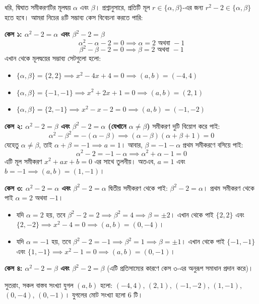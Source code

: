 \documentclass[12pt, a4paper]{article}
\begin{document}
\begin{tcolorbox}[solutionbox={সমাধান (Solution)}]
    \noindent
    ধরি, দ্বিঘাত সমীকরণটির মূলদ্বয় $\alpha$ এবং $\beta$। প্রশ্নানুসারে, প্রতিটি মূল $r \in \{\alpha, \beta\}$-এর জন্য $r^2 - 2 \in \{\alpha, \beta\}$ হতে হবে। আমরা নিচের ৪টি সম্ভাব্য কেস বিবেচনা করতে পারি:
    
    \vspace{0.5em}
    \textbf{কেস ১: $\alpha^2 - 2 = \alpha$ এবং $\beta^2 - 2 = \beta$}
    \[ \alpha^2 - \alpha - 2 = 0 \implies \alpha = 2 \text{ অথবা } -1 \]
    \[ \beta^2 - \beta - 2 = 0 \implies \beta = 2 \text{ অথবা } -1 \]
    এখান থেকে মূলদ্বয়ের সম্ভাব্য সেটগুলো হলো:
    \begin{itemize}
        \item $\{\alpha, \beta\} = \{2, 2\} \implies x^2 - 4x + 4 = 0 \implies (a, b) = (-4, 4)$
        \item $\{\alpha, \beta\} = \{-1, -1\} \implies x^2 + 2x + 1 = 0 \implies (a, b) = (2, 1)$
        \item $\{\alpha, \beta\} = \{2, -1\} \implies x^2 - x - 2 = 0 \implies (a, b) = (-1, -2)$
    \end{itemize}
    
    \vspace{0.5em}
    \textbf{কেস ২: $\alpha^2 - 2 = \beta$ এবং $\beta^2 - 2 = \alpha$ (যেখানে $\alpha \ne \beta$)}
    সমীকরণ দুটি বিয়োগ করে পাই:
    \[ \alpha^2 - \beta^2 = -(\alpha - \beta) \implies (\alpha - \beta)(\alpha + \beta + 1) = 0 \]
    যেহেতু $\alpha \ne \beta$, তাই $\alpha + \beta = -1 \implies a = 1$। আবার, $\beta = -1 - \alpha$ প্রথম সমীকরণে বসিয়ে পাই:
    \[ \alpha^2 - 2 = -1 - \alpha \implies \alpha^2 + \alpha - 1 = 0 \]
    এটি মূল সমীকরণ $x^2 + ax + b = 0$ এর সাথে তুলনীয়। অতএব, $a = 1$ এবং $b = -1 \implies (a, b) = (1, -1)$।
    
    \vspace{0.5em}
    \textbf{কেস ৩: $\alpha^2 - 2 = \alpha$ এবং $\beta^2 - 2 = \alpha$}
    দ্বিতীয় সমীকরণ থেকে পাই: $\beta^2 - 2 = \alpha$। প্রথম সমীকরণ থেকে পাই $\alpha = 2$ অথবা $-1$।
    \begin{itemize}
        \item যদি $\alpha = 2$ হয়, তবে $\beta^2 - 2 = 2 \implies \beta^2 = 4 \implies \beta = \pm 2$। এখান থেকে পাই $\{2, 2\}$ এবং $\{2, -2\} \implies x^2 - 4 = 0 \implies (a, b) = (0, -4)$।
        \item যদি $\alpha = -1$ হয়, তবে $\beta^2 - 2 = -1 \implies \beta^2 = 1 \implies \beta = \pm 1$। এখান থেকে পাই $\{-1, -1\}$ এবং $\{1, -1\} \implies x^2 - 1 = 0 \implies (a, b) = (0, -1)$।
    \end{itemize}
    
    \vspace{0.5em}
    \textbf{কেস ৪: $\alpha^2 - 2 = \beta$ এবং $\beta^2 - 2 = \beta$} (এটি প্রতিসাম্যের কারণে কেস ৩-এর অনুরূপ সমাধান প্রদান করে)।
    
    \vspace{0.5em}
    সুতরাং, সকল বাস্তব সংখ্যা যুগল $(a, b)$ হলো: $(-4, 4)$, $(2, 1)$, $(-1, -2)$, $(1, -1)$, $(0, -4)$, $(0, -1)$। যুগলের মোট সংখ্যা হলো $6$ টি।
\end{tcolorbox}
\end{document}
